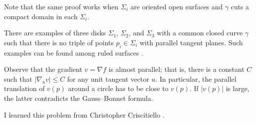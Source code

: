 Note that the same proof works when $\Sigma_i$ are oriented open surfaces and $\gamma$ cuts a compact domain in each $\Sigma_i$.

There are examples of three disks $\Sigma_1$, $\Sigma_2$, and $\Sigma_3$
with a common closed curve $\gamma$ such that there is
no triple of points $p_i\in\Sigma_i$ with parallel tangent planes.
Such examples can be found among ruled surfaces \cite{three-disks}.

Observe that the gradient $v=\nabla f$ is almost parallel;
that is, there is a constant $C$ such that $|\nabla_u v|\le C$ for any unit tangent vector $u$.
In particular, the parallel translation of $v(p)$ around a circle has to be close to $v(p)$.
If $|v(p)|$ is large, the latter contradicts the Gauss--Bonnet formula.

\medskip

I learned this problem from Christopher Criscitiello \cite{ccriscitiello}.

